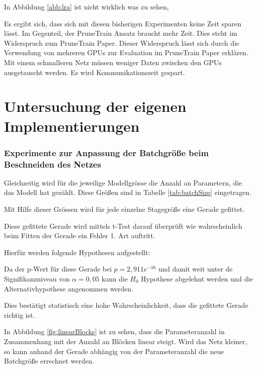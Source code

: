  In Abbildung \ref{abb:lra} ist nicht wirklich was zu sehen, 
 
 
 
Es ergibt sich, dass sich mit diesen bisherigen Experimenten keine Zeit sparen lässt. Im Gegenteil, der PruneTrain Ansatz braucht mehr Zeit. Dies steht im Widerspruch zum PruneTrain Paper. Dieser Widerspruch lässt sich durch die Verwendung von mehreren GPUs zur Evaluation im PruneTrain Paper erklären. Mit einem schmalleren Netz müssen weniger Daten zwischen den GPUs ausgetauscht werden. Es wird Kommunikationszeit gespart.





\chapter{Untersuchung der eigenen Implementierungen}
\subsection{Experimente zur Anpassung der Batchgröße beim Beschneiden des Netzes}\label{sec:ptnew}



Gleichzeitig wird für die jeweilige Modellgrösse die Anzahl an Parametern, die das Modell hat gezählt. Diese Größen sind in Tabelle \ref{tab:batchSize} eingetragen. 


Mit Hilfe dieser Grössen wird für jede einzelne Stagegröße eine Gerade gefittet.

Diese gefittete Gerade wird mittels t-Test darauf überprüft wie wahrscheinlich beim Fitten der Gerade ein Fehler 1. Art auftritt.

Hierfür werden folgende Hypothesen aufgestellt:


Da der p-Wert für diese Gerade bei $p=2,911e^{-16}$ und damit weit unter de Signifikanzniveau von $\alpha=0,05$ kann die $H_0$ Hypothese abgelehnt werden und die Alternativhypothese angenommen werden.

Dies bestätigt statistisch eine hohe Wahrscheinlichkeit, dass die gefittete Gerade richtig ist.



In Abbildung \ref{fig:linearBlocks} ist zu sehen, dass die Parameteranzahl in Zusammenhang mit der Anzahl an Blöcken linear steigt.
Wird das Netz kleiner, so kann anhand der Gerade abhängig von der Parameteranzahl die neue Batchgröße errechnet werden.






